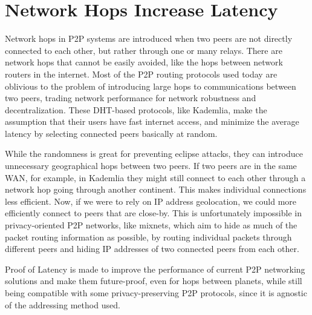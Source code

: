 \section{Network Hops Increase Latency}
Network hops in P2P systems are introduced when two peers are not directly connected to each other, but rather through one or many relays. There are network hops that cannot be easily avoided, like the hops between network routers in the internet. Most of the P2P routing protocols used today are oblivious to the problem of introducing large hops to communications between two peers, trading network performance for network robustness and decentralization. These DHT-based protocols, like Kademlia, make the assumption that their users have fast internet access, and minimize the average latency by selecting connected peers basically at random.

While the randomness is great for preventing eclipse attacks, they can introduce unnecessary geographical hops between two peers. If two peers are in the same WAN, for example, in Kademlia they might still connect to each other through a network hop going through another continent. This makes individual connections less efficient.
Now, if we were to rely on IP address geolocation, we could more efficiently connect to peers that are close-by. This is unfortunately impossible in privacy-oriented P2P networks, like mixnets, which aim to hide as much of the packet routing information as possible, by routing individual packets through different peers and hiding IP addresses of two connected peers from each other.~\cite{Harry_Halpin_undated-sq}

Proof of Latency is made to improve the performance of current P2P networking solutions and make them future-proof, even for hops between planets, while still being compatible with some privacy-preserving P2P protocols, since it is agnostic of the addressing method used.

